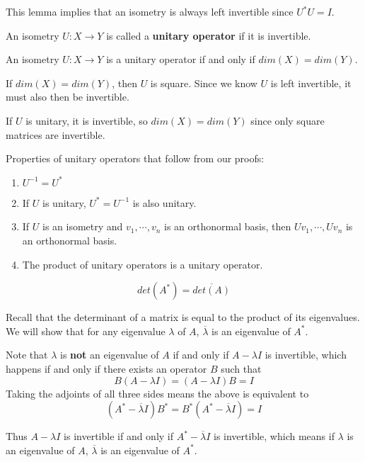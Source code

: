 This lemma implies that an isometry is always left invertible since $U^{*}U = I$. 

\begin{definition}
An isometry $U: X \rightarrow Y$ is called a \textbf{unitary operator} if it is invertible.  
\end{definition}

\begin{lemma}
An isometry $U: X \rightarrow Y$ is a unitary operator if and only if $dim(X) = dim(Y)$. 
\end{lemma}

\begin{lproof}
If $dim(X) = dim(Y)$, then $U$ is square. Since we know $U$ is left invertible, it must also then be invertible. 

If $U$ is unitary, it is invertible, so $dim(X) = dim(Y)$ since only square matrices are invertible. 
\end{lproof}

Properties of unitary operators that follow from our proofs: 
\begin{enumerate}
	\item $U^{-1} = U^{*}$ 
	\item If $U$ is unitary, $U^{*} = U^{-1}$ is also unitary. 
	\item If $U$ is an isometry and $v_{1}, \cdots, v_{n}$ is an orthonormal basis, then $Uv_{1}, \cdots, Uv_{n}$ is an orthonormal basis. 
	\item The product of unitary operators is a unitary operator. 
\end{enumerate}

\begin{lemma}
$$det(A^{*}) = \overline{det(A)}$$
\end{lemma}

\begin{lproof}
Recall that the determinant of a matrix is equal to the product of its eigenvalues. We will show that for any eigenvalue $\lambda$ of $A$, $\overline{\lambda}$ is an eigenvalue of $A^{*}$. 

Note that $\lambda$ is \textbf{not} an eigenvalue of $A$ if and only if $A - \lambda I$ is invertible, which happens if and only if there exists an operator $B$ such that 
$$B(A - \lambda I) = (A - \lambda I)B = I$$
Taking the adjoints of all three sides means the above is equivalent to 
$$(A^{*} - \overline{\lambda}I)B^{*} = B^{*} (A^{*} - \overline{\lambda}I) = I$$

Thus $A - \lambda I$ is invertible if and only if $A^{*} - \overline{\lambda}I$ is invertible, which means if $\lambda$ is an eigenvalue of $A$, $\overline{\lambda}$ is an eigenvalue of $A^{*}$. 
\end{lproof}

